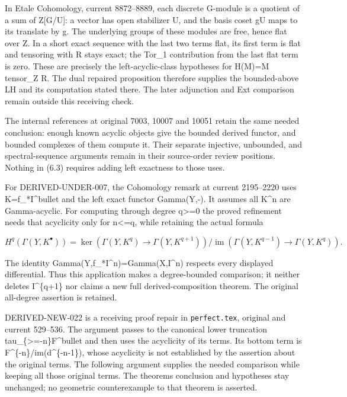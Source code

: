 \documentclass[11pt]{article}
\begin{document}
In Etale Cohomology,\allowbreak{} current 8872–\allowbreak{}8889,\allowbreak{} each discrete G-module is a quotient of a sum of Z[G/\allowbreak{}U]\allowbreak{}:\allowbreak{} a vector has open stabilizer U,\allowbreak{} and the basis coset gU maps to its translate by g. The underlying groups of these modules are free,\allowbreak{} hence flat over Z. In a short exact sequence with the last two terms flat,\allowbreak{} its first term is flat and tensoring with R stays exact; the Tor\_\allowbreak{}1 contribution from the last flat term is zero. These are precisely the left-acyclic-class hypotheses for H(M)\allowbreak{}\allowbreak{}=M tensor\_\allowbreak{}Z R. The dual repaired proposition therefore supplies the bounded-above LH and its computation stated there. The later adjunction and Ext comparison remain outside this receiving check.

The internal references at original 7003,\allowbreak{} 10007 and 10051 retain the same needed conclusion:\allowbreak{} enough known acyclic objects give the bounded derived functor,\allowbreak{} and bounded complexes of them compute it. Their separate injective,\allowbreak{} unbounded,\allowbreak{} and spectral-sequence arguments remain in their source-order review positions. Nothing in (6.3)\allowbreak{} requires adding left exactness to those uses.

For DERIVED-UNDER-007,\allowbreak{} the Cohomology remark at current 2195–\allowbreak{}2220 uses K\allowbreak{}=f\_\allowbreak{}*I\textasciicircum{}bullet and the left exact functor Gamma(Y,\allowbreak{}-)\allowbreak{}. It assumes all K\^{}n are Gamma-acyclic. For computing through degree q>\allowbreak{}=0 the proved refinement needs that acyclicity only for n<\allowbreak{}=q,\allowbreak{} while retaining the actual formula

\[
 H^q(\Gamma(Y,K^\bullet))=
 \ker(\Gamma(Y,K^q)\to\Gamma(Y,K^{q+1}))\big/
 \operatorname{im}(\Gamma(Y,K^{q-1})\to\Gamma(Y,K^q)).     \tag{7.1}
\]

The identity Gamma(Y,\allowbreak{}f\_\allowbreak{}*I\textasciicircum{}n)\allowbreak{}\allowbreak{}=Gamma(X,\allowbreak{}I\textasciicircum{}n)\allowbreak{} respects every displayed differential. Thus this application makes a degree-bounded comparison; it neither deletes I\textasciicircum{}\{q\allowbreak{}+1\} nor claims a new full derived-composition theorem. The original all-degree assertion is retained.

DERIVED-NEW-022 is a receiving proof repair in \texttt{perfect.\allowbreak{}tex},\allowbreak{} original and current 529–\allowbreak{}536. The argument passes to the canonical lower truncation tau\_\allowbreak{}\{>\allowbreak{}=-n\}F\textasciicircum{}bullet and then uses the acyclicity of its terms. Its bottom term is F\textasciicircum{}\{-n\}/\allowbreak{}im(d\textasciicircum{}\{-n-1\})\allowbreak{},\allowbreak{} whose acyclicity is not established by the assertion about the original terms. The following argument supplies the needed comparison while keeping all those original terms. The theorem\textquotesingle s conclusion and hypotheses stay unchanged; no geometric counterexample to that theorem is asserted.
\end{document}
